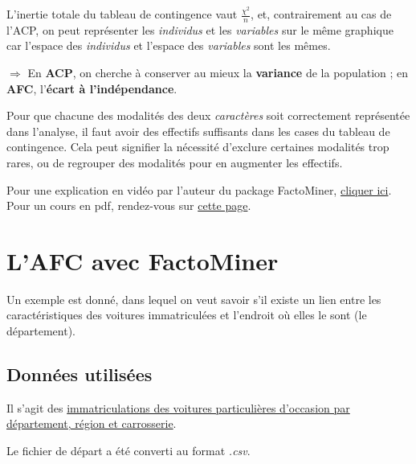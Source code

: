 \documentclass[]{book}
\begin{document}
L'inertie totale du tableau de contingence vaut \(\frac{\chi^2}{n}\), et, contrairement au cas de l'ACP, on peut représenter les \emph{individus} et les \emph{variables} sur le même graphique car l'espace des \emph{individus} et l'espace des \emph{variables} sont les mêmes.

\(\Rightarrow\) En \textbf{ACP}, on cherche à conserver au mieux la \textbf{variance} de la population ; en \textbf{AFC}, l'\textbf{écart à l'indépendance}.

Pour que chacune des modalités des deux \emph{caractères} soit correctement représentée dans l'analyse, il faut avoir des effectifs suffisants dans les cases du tableau de contingence. Cela peut signifier la nécessité d'exclure certaines modalités trop rares, ou de regrouper des modalités pour en augmenter les effectifs.

Pour une explication en vidéo par l'auteur du package FactoMiner, \href{https://www.youtube.com/watch?v=f_lgjXVdTAk}{cliquer ici}.
Pour un cours en pdf, rendez-vous sur \href{http://factominer.free.fr/docs/cours_afc.pdf}{cette page}.

\hypertarget{lafc-avec-factominer}{%
\section{L'AFC avec FactoMiner}\label{lafc-avec-factominer}}

Un exemple est donné, dans lequel on veut savoir s'il existe un lien entre les caractéristiques des voitures immatriculées et l'endroit où elles le sont (le département).

\hypertarget{donnees-utilisees-1}{%
\subsection{Données utilisées}\label{donnees-utilisees-1}}

Il s'agit des \href{http://www.statistiques.developpement-durable.gouv.fr/fileadmin/documents/Themes/Transports/Vehicules_routiers/Immatriculations/resultats_detailles/2015/immatriculations-2015-2ir2.xls}{immatriculations des voitures particulières d'occasion par département, région et carrosserie}.

Le fichier de départ a été converti au format \emph{.csv}.
\end{document}
